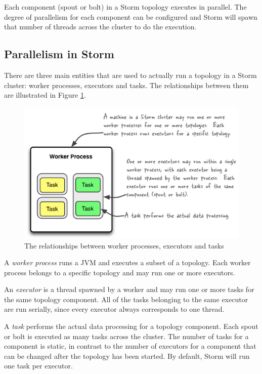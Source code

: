 Each component (spout or bolt) in a Storm topology executes in parallel. The degree of parallelism for each component can be configured and Storm will spawn that number of threads across the cluster to do the execution.

\subsection{Parallelism in Storm}

There are three main entities that are used to actually run a topology in a Storm cluster: worker processes, executors and tasks. The relationships between them are illustrated in Figure \ref{figure:storm_parallelism}.

\begin{figure}[H]
\centering
\includegraphics{figures/storm_parallelism}
\caption{The relationships between worker processes, executors and tasks}
\label{figure:storm_parallelism}
\end{figure}

A \emph{worker process} runs a JVM and executes a subset of a topology. Each worker process belongs to a specific topology and may run one or more executors.

An \emph{executor} is a thread spawned by a worker and may run one or more tasks for the same topology component. All of the tasks belonging to the same executor are run serially, since every executor always corresponds to one thread.

A \emph{task} performs the actual data processing for a topology component. Each spout or bolt is executed as many tasks across the cluster. The number of tasks for a component is static, in contrast to the number of executors for a component that can be changed after the topology has been started. By default, Storm will run one task per executor.

